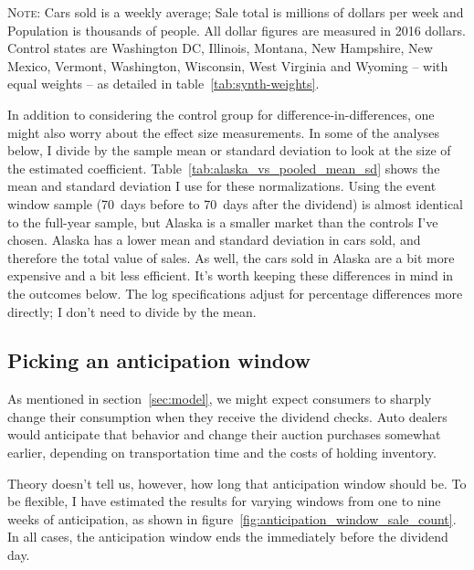 \documentclass[11pt,letterpaper,oneside]{article}
\begin{document}
\begin{doublespacing}
\begin{table}[bth]
    {\footnotesize
    \textsc{Note:}
    Cars sold is a weekly average; Sale total is millions of dollars per week and Population is thousands of people. All dollar figures are measured in 2016 dollars.
    Control states are Washington DC, Illinois, Montana, New Hampshire, New Mexico, Vermont, Washington, Wisconsin, West Virginia and Wyoming -- with equal weights -- as detailed in table~\ref{tab:synth-weights}.
    }

\end{table}


In addition to considering the control group for difference\hyp{}in\hyp{}differences, one might also worry about the effect size measurements.
In some of the analyses below, I divide by the sample mean or standard deviation to look at the size of the estimated coefficient.
Table~\ref{tab:alaska_vs_pooled_mean_sd} shows the mean and standard deviation I use for these normalizations.
Using the event window sample (70~days before to 70~days after the dividend) is almost identical to the full\hyp{}year sample, but Alaska is a smaller market than the controls I've chosen.
Alaska has a lower mean and standard deviation in cars sold, and therefore the total value of sales.
As well, the cars sold in Alaska are a bit more expensive and a bit less efficient.
It's worth keeping these differences in mind in the outcomes below.
The log specifications adjust for percentage differences more directly; I don't need to divide by the mean.



\subsection{Picking an anticipation window}

As mentioned in section~\ref{sec:model}, we might expect consumers to sharply change their consumption when they receive the dividend checks.
Auto dealers would anticipate that behavior and change their auction purchases somewhat earlier, depending on transportation time and the costs of holding inventory.

Theory doesn't tell us, however, how long that anticipation window should be.
To be flexible, I have estimated the results for varying windows from one to nine weeks of anticipation, as shown in figure~\ref{fig:anticipation_window_sale_count}.
In all cases, the anticipation window ends the immediately before the dividend day.


\end{doublespacing}
\end{document}
